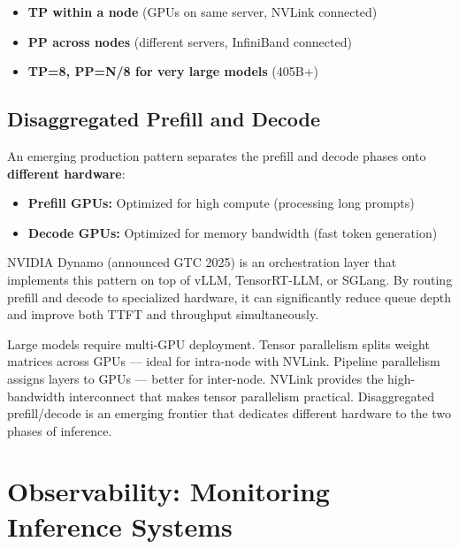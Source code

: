 \documentclass[10pt, oneside, openany]{book}
\newcommand{\tipbox}[2]{\begin{tcolorbox}[tipstyle, title={#1}]#2\end{tcolorbox}}
\newenvironment{chapsummary}
  {\begin{tcolorbox}[enhanced, breakable,
    colback={rgb,255:red,245;green,245;blue,225},
    colframe=AccentOrange, boxrule=1.5pt, arc=4pt,
    title={\bfseries Chapter Summary},
    fonttitle=\bfseries\color{white},
    attach boxed title to top left={yshift=-2mm, xshift=5mm},
    boxed title style={colback=AccentOrange, arc=2pt}]}
  {\end{tcolorbox}}
\begin{document}
\tipbox{The Parallelism Recipe}{
\begin{itemize}
  \item \textbf{TP within a node} (GPUs on same server, NVLink connected)
  \item \textbf{PP across nodes} (different servers, InfiniBand connected)
  \item \textbf{TP=8, PP=N/8 for very large models} (405B+)
\end{itemize}
}

\section{Disaggregated Prefill and Decode}

An emerging production pattern separates the prefill and decode phases onto
\textbf{different hardware}:

\begin{itemize}
  \item \textbf{Prefill GPUs:} Optimized for high compute (processing long prompts)
  \item \textbf{Decode GPUs:} Optimized for memory bandwidth (fast token generation)
\end{itemize}

NVIDIA Dynamo (announced GTC 2025) is an orchestration layer that implements this
pattern on top of vLLM, TensorRT-LLM, or SGLang.  By routing prefill and decode to
specialized hardware, it can significantly reduce queue depth and improve both TTFT
and throughput simultaneously.

\begin{chapsummary}
Large models require multi-GPU deployment.  Tensor parallelism splits weight
matrices across GPUs --- ideal for intra-node with NVLink.  Pipeline parallelism
assigns layers to GPUs --- better for inter-node.  NVLink provides the
high-bandwidth interconnect that makes tensor parallelism practical.  Disaggregated
prefill/decode is an emerging frontier that dedicates different hardware to the
two phases of inference.
\end{chapsummary}

\chapter{Observability: Monitoring Inference Systems}
\label{ch:observability}
\end{document}

